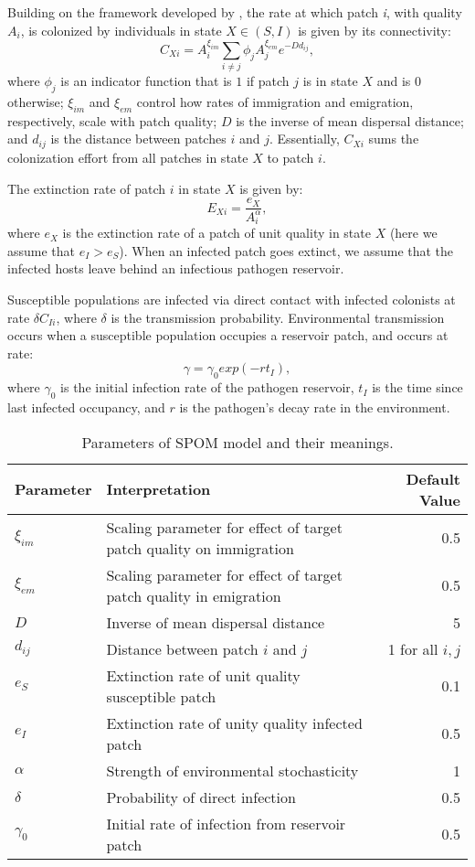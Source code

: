 \documentclass{svjour3}
\begin{document}
Building on the framework developed by \cite{Hanski1994}, the rate at which patch \emph{i}, with quality $A_i$, is colonized by individuals in state $X \in (S,I)$ is given by its connectivity:
\begin{equation}
C_{Xi}=A_i^{\xi_{im}} \sum_{i\neq j }\phi_jA_j^{\xi_{em}}e^{-D d_{ij}},
\end{equation}
where $\phi_j$ is an indicator function that is $1$ if patch $j$ is in state $X$ and is $0$ otherwise; $\xi_{im}$ and $\xi_{em}$ control how rates of immigration and emigration, respectively, scale with patch quality; $D$ is the inverse of mean dispersal distance; and $d_{ij}$ is the distance between patches $i$ and $j$.  Essentially, $C_{Xi}$ sums the colonization effort from all patches in state $X$ to patch $i$.  

The extinction rate of patch $i$ in state $X$ is given by:
\begin{equation}
E_{Xi}=\frac{e_X}{A_i^\alpha},
\end{equation}
where $e_X$ is the extinction rate of a patch of unit quality in state $X$ (here we assume that $e_I>e_S$).  When an infected patch goes extinct, we assume that the infected hosts leave behind an infectious pathogen reservoir.  

Susceptible populations are infected via direct contact with infected colonists at rate $\delta C_{Ii}$, where $\delta$ is the transmission probability.  Environmental transmission occurs when a susceptible population occupies a reservoir patch, and occurs at rate:
\begin{equation}
\gamma=\gamma_0exp(-rt_I),
\end{equation}
where $\gamma_0$ is the initial infection rate of the pathogen reservoir, $t_I$ is the time since last infected occupancy, and $r$ is the pathogen's decay rate in the environment.


\begin{table}[h!]
\label{parameters}      
\caption{Parameters of SPOM model and their meanings.}
\begin{tabular}{l p{8.5cm} r}
Parameter & Interpretation &  Default Value\\
\hline
$\xi_{im}$ & Scaling parameter for effect of target patch quality on immigration & 0.5\\
$\xi_{em}$ & Scaling parameter for effect of target patch quality in emigration & 0.5\\
$D$& Inverse of mean dispersal distance & 5\\
$d_{ij}$ & Distance between patch $i$ and $j$ & 1 for all $i,j$\\
\hline
$e_S$ & Extinction rate of unit quality susceptible patch & 0.1\\
$e_I$ & Extinction rate of unity quality infected patch & 0.5\\
$\alpha$ & Strength of environmental stochasticity & 1\\
\hline
$\delta$ & Probability of direct infection & 0.5\\
$\gamma_0$ & Initial rate of infection from reservoir patch & 0.5
\end{tabular}
\end{table}
\end{document}
